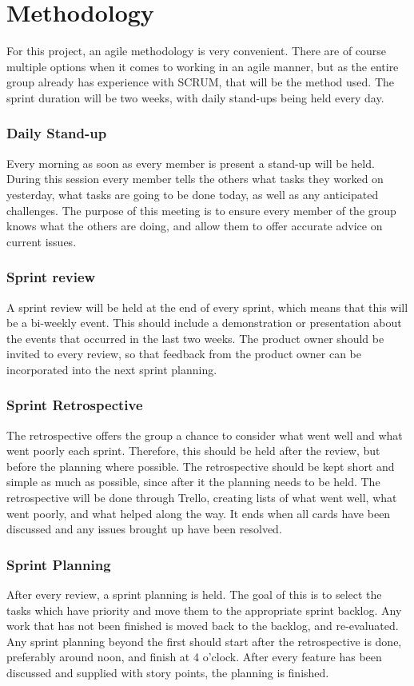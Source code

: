 \section{Methodology}
For this project, an agile methodology is very convenient.
There are of course multiple options when it comes to working in an agile manner, but as the entire group already has experience with SCRUM, that will be the method used.
The sprint duration will be two weeks, with daily stand-ups  being held every day.

\subsubsection{Daily Stand-up}
\label{sec::standup}
Every morning as soon as every member is present a stand-up will be held.
During this session every member tells the others what tasks they worked on yesterday, what tasks are going to be done today, as well as any anticipated challenges.
The purpose of this meeting is to ensure every member of the group knows what the others are doing, and allow them to offer accurate advice on current issues.

\subsubsection{Sprint review}
\label{sec::sprintrev}
A sprint review will be held at the end of every sprint, which means that this will be a bi-weekly event.
This should include a demonstration or presentation about the events that occurred in the last two weeks.
The product owner should be invited to every review, so that feedback from the product owner can be incorporated into the next sprint planning.

\subsubsection{Sprint Retrospective}
The retrospective offers the group a chance to consider what went well and what went poorly each sprint.
Therefore, this should be held after the review, but before the planning where possible.
The retrospective should be kept short and simple as much as possible, since after it the planning needs to be held.
The retrospective will be done through Trello, creating lists of what went well, what went poorly, and what helped along the way.
It ends when all cards have been discussed and any issues brought up have been resolved.

\subsubsection{Sprint Planning}
After every review, a sprint planning is held.
The goal of this is to select the tasks which have priority and move them to the appropriate sprint backlog. 
Any work that has not been finished is moved back to the backlog, and re-evaluated.
Any sprint planning beyond the first should start after the retrospective is done, preferably around noon, and finish at 4 o'clock.
After every feature has been discussed and supplied with story points, the planning is finished.
\newpage

